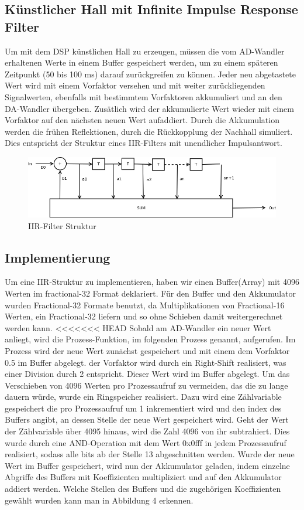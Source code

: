 \documentclass[a4paper,12pt,fontsize=12,DIV=12]{scrartcl}
\begin{document}
\subsection{Künstlicher Hall mit Infinite Impulse Response Filter}
Um mit dem DSP künstlichen Hall zu erzeugen, müssen die vom AD-Wandler erhaltenen Werte in einem Buffer gespeichert werden, um zu einem späteren Zeitpunkt (50 bis 100 ms) darauf zurückgreifen zu können. Jeder neu abgetastete Wert wird mit einem Vorfaktor versehen und mit weiter zurückliegenden Signalwerten, ebenfalls mit bestimmtem Vorfaktoren akkumuliert und an den DA-Wandler übergeben. Zusätlich wird der akkumulierte Wert wieder mit einem Vorfaktor auf den nächsten neuen Wert aufaddiert. Durch die Akkumulation werden die frühen Reflektionen, durch die Rückkopplung der Nachhall simuliert. 
Dies entspricht der Struktur eines IIR-Filters mit unendlicher Impulsantwort.
\begin{figure}[h]
	\includegraphics[scale=0.5]{Bilder/iir.png}
	\caption{IIR-Filter Struktur}
	\label{labelnameIIR-Filter Struktur}
\end{figure}

\subsection{Implementierung}
Um eine IIR-Struktur zu implementieren, haben wir einen Buffer(Array) mit 4096 Werten im fractional-32 Format deklariert. Für den Buffer und den Akkumulator wurden Fractional-32 Formate benutzt, da Multiplikationen von Fractional-16 Werten, ein Fractional-32 liefern und so ohne Schieben damit weitergerechnet werden kann.
<<<<<<< HEAD
Sobald am AD-Wandler ein neuer Wert anliegt, wird die Prozess-Funktion, im folgenden Prozess genannt, aufgerufen. Im Prozess wird der neue Wert zunächst gespeichert und mit einem dem Vorfaktor 0.5 im Buffer abgelegt. der Vorfaktor wird durch ein Right-Shift realisiert, was einer Division durch 2 entspricht.
Dieser Wert wird im Buffer abgelegt. Um das Verschieben von 4096 Werten pro Prozessaufruf zu vermeiden, das die zu lange dauern würde, wurde ein Ringspeicher realisiert. Dazu wird eine Zählvariable gespeichert die pro Prozessaufruf um 1 inkrementiert wird und den index des Buffers angibt, an dessen Stelle der neue Wert gespeichert wird. Geht der Wert der  Zählvariable über 4095 hinaus, wird die Zahl 4096 von ihr subtrahiert. Dies wurde durch eine AND-Operation mit dem Wert 0x0fff in jedem Prozessaufruf realisiert, sodass alle bits ab der Stelle 13 abgeschnitten werden.
Wurde der neue Wert im Buffer gespeichert, wird nun der Akkumulator geladen, indem einzelne Abgriffe des Buffers mit Koeffizienten multipliziert und auf den Akkumulator addiert werden. Welche Stellen des Buffers und die zugehörigen Koeffizienten gewählt wurden kann man in Abbildung 4 erkennen.
\newpage
\end{document}
